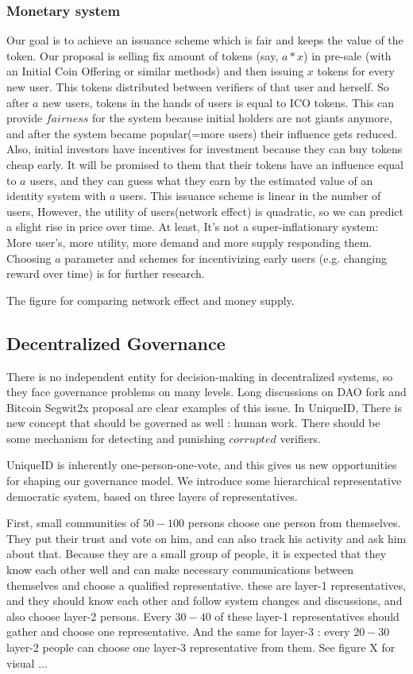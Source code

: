 \documentclass[conference]{IEEEtran}
\begin{document}
\subsubsection{Monetary system}
Our goal is to achieve an issuance scheme which is fair and keeps the value of the token. Our proposal is selling fix amount of tokens (say, $a*x$) in pre-sale (with an Initial Coin Offering or similar methods) and then issuing $x$ tokens for every new user. This tokens distributed between verifiers of that user and herself. So after $a$ new users, tokens in the hands of users is equal to ICO tokens. This can provide $fairness$ for the system because initial holders are not giants anymore, and after the system became popular(=more users) their influence gets reduced. Also, initial investors have incentives for investment because they can buy tokens cheap early. It will be promised to them that their tokens have an influence equal to $a$ users, and they can guess what they earn by the estimated value of an identity system with $a$ users. This issuance scheme is linear in the number of users, However, the utility of users(network effect) is quadratic, so we can predict a slight rise in price over time. At least, It's not a super-inflationary system: More user's, more utility, more demand and more supply responding them. Choosing $a$ parameter and schemes for incentivizing early users (e.g. changing reward over time) is for further research.




The figure for comparing network effect and money supply.

\subsection{Decentralized Governance}
There is no independent entity for decision-making in decentralized systems, so they face governance problems on many levels. Long discussions on  DAO fork and Bitcoin Segwit2x proposal are clear examples of this issue. In UniqueID, There is new concept that should be governed as well : human work. There should be some mechanism for detecting and punishing $corrupted$ verifiers.


UniqueID is inherently one-person-one-vote, and this gives us new opportunities for shaping our governance model. We introduce some hierarchical representative democratic system, based on three layers of representatives. 


First, small communities of $50-100$ persons choose one person from themselves. They put their trust and vote on him, and can also track his activity and ask him about that. Because they are a small group of people, it is expected that they know each other well and can make necessary communications between themselves and choose a qualified representative. these are layer-1 representatives, and they should know each other and follow system changes and discussions, and also choose layer-2 persons. Every $30-40$ of these layer-1 representatives should gather and choose one representative. And the same for layer-3 : every $20-30$ layer-2 people can choose one layer-3 representative from them. See figure X for visual ...
\end{document}
